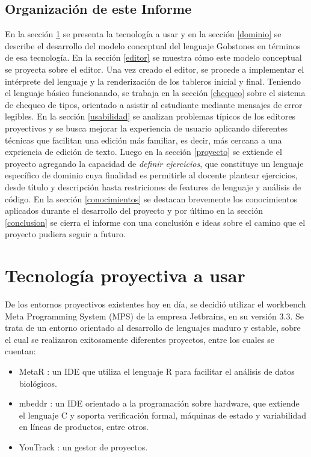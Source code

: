 \subsection{Organización de este Informe}

En la sección \ref{tecnologias} se presenta la tecnología a usar y en la sección \ref{dominio} se describe el desarrollo del modelo conceptual del lenguaje Gobstones en términos de esa tecnología. En la sección \ref{editor} se muestra cómo este modelo conceptual se proyecta sobre el editor. Una vez creado el editor, se procede a implementar el intérprete del lenguaje y la renderización de los tableros inicial y final. Teniendo el lenguaje básico funcionando, se trabaja en la sección \ref{chequeo} sobre el sistema de chequeo de tipos, orientado a asistir al estudiante mediante mensajes de error legibles. En la sección \ref{usabilidad} se analizan problemas típicos de los editores proyectivos y se busca mejorar la experiencia de usuario aplicando diferentes técnicas que facilitan una edición más familiar, es decir, más cercana a una expriencia de edición de texto. Luego en la sección \ref{proyecto} se extiende el proyecto agregando la capacidad de \textit{definir ejercicios}, que constituye un lenguaje específico de dominio cuya finalidad es permitirle al docente plantear ejercicios, desde título y descripción hasta restriciones de features de lenguaje y análisis de código. En la sección \ref{conocimientos} se destacan brevemente los conocimientos aplicados durante el desarrollo del proyecto y por último en la sección \ref{conclusion} se cierra el informe con una conclusión e ideas sobre el camino que el proyecto pudiera seguir a futuro.

\section{Tecnología proyectiva a usar}\label{tecnologias}

De los entornos proyectivos existentes hoy en día, se decidió utilizar el workbench Meta Programming System (MPS)  de la empresa Jetbrains, en su versión 3.3.
Se trata de un entorno orientado al desarrollo de lenguajes maduro y estable, sobre el cual se realizaron exitosamente diferentes proyectos, entre los cuales se cuentan:
\begin{itemize}
\item MetaR : un IDE que utiliza el lenguaje R para facilitar el análisis de datos biológicos.
\item mbeddr : un IDE orientado a la programación sobre hardware, que extiende el lenguaje C y soporta verificación formal, máquinas de estado y variabilidad en líneas de productos, entre otros.
\item YouTrack : un gestor de proyectos.
\end{itemize}

